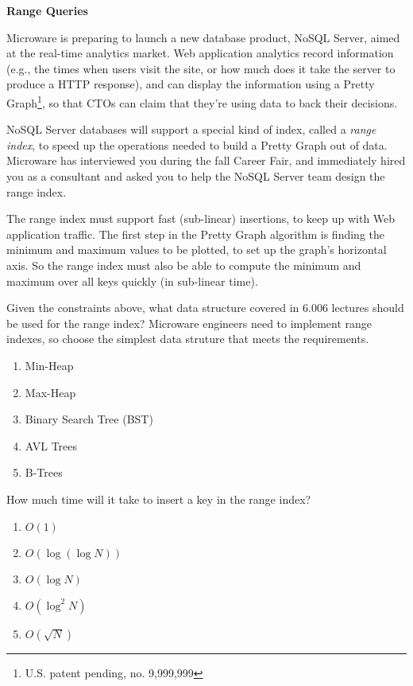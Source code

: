 \documentclass[12pt,twoside]{article}
\begin{document}
\begin{problems}

\problem {} \textbf{Range Queries}

Microware is preparing to launch a new database product, NoSQL Server, aimed at
the real-time analytics market. Web application analytics record information
(e.g., the times when users visit the site, or how much does it take the
server to produce a HTTP response), and can display the information using
a Pretty Graph\texttrademark\footnote{U.S. patent pending, no. 9,999,999}, so
that CTOs can claim that they're using data to back their decisions.

NoSQL Server databases will support a special kind of index, called a  
\textit{range index}, to speed up the operations needed to build a Pretty
Graph\texttrademark{} out of data. Microware has interviewed you during the fall
Career Fair, and immediately hired you as a consultant and asked you to help the
NoSQL Server team design the range index.

The range index must support fast (sub-linear) insertions, to keep up with Web
application traffic. The first step in the Pretty Graph\texttrademark{}
algorithm is finding the minimum and maximum values to be plotted, to set up the
graph's horizontal axis. So the range index must also be able to compute the
minimum and maximum over all keys quickly (in sub-linear time).

\begin{problemparts}
\problempart {} Given the constraints above, what data structure covered
in 6.006 lectures should be used for the range index? Microware engineers need
to implement range indexes, so choose the simplest data struture that meets the
requirements.
\begin{enumerate}
  \item Min-Heap
  \item Max-Heap
  \item Binary Search Tree (BST)
  \item AVL Trees 
  \item B-Trees
\end{enumerate}

\problempart {} How much time will it take to insert a key in the range
index?
\begin{enumerate}
  \item $O(1)$
  \item $O(\log(\log N))$
  \item $O(\log N)$
  \item $O(\log^2 N)$
  \item $O(\sqrt{N})$
\end{enumerate}


\end{problemparts}
\end{problems}
\end{document}
